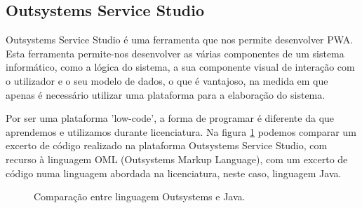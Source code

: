 \subsection{Outsystems Service Studio} \label{sec:outsystemss}
Outsystems Service Studio é uma ferramenta que nos permite desenvolver PWA. Esta ferramenta permite-nos desenvolver as várias componentes de um sistema informático, como a lógica do sistema, a sua componente visual de interação com o utilizador e o seu modelo de dados, o que é vantajoso, na medida em que apenas é necessário utilizar uma plataforma para a elaboração do sistema.\par
Por ser uma plataforma 'low-code', a forma de programar é diferente da que aprendemos e utilizamos durante licenciatura. Na figura \ref{fig:osjava} podemos comparar um excerto de código realizado na plataforma Outsystems Service Studio, com recurso à linguagem OML (Outsystems Markup Language), com um excerto de código numa linguagem abordada na licenciatura, neste caso, linguagem Java.

\vspace{5.5cm} 

\begin{figure}[ht!]
\centering
{}
\caption{Comparação entre linguagem Outsystems e Java.}
\label{fig:osjava}
\end{figure}

